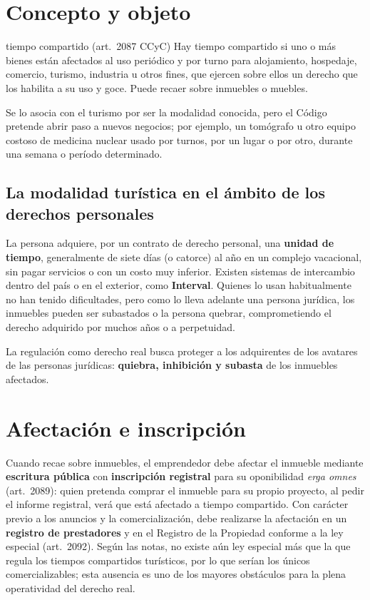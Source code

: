 \documentclass[12pt,oneside]{book}
\begin{document}
\section{Concepto y objeto}

\begin{definicion}{tiempo compartido (art.~2087 CCyC)}
Hay tiempo compartido si uno o más bienes están afectados al uso periódico y por turno para alojamiento, hospedaje, comercio, turismo, industria u otros fines, que ejercen sobre ellos un derecho que los habilita a su uso y goce. Puede recaer sobre inmuebles o muebles.
\end{definicion}

Se lo asocia con el turismo por ser la modalidad conocida, pero el Código pretende abrir paso a nuevos negocios; por ejemplo, un tomógrafo u otro equipo costoso de medicina nuclear usado por turnos, por un lugar o por otro, durante una semana o período determinado.

\subsection{La modalidad turística en el ámbito de los derechos personales}

La persona adquiere, por un contrato de derecho personal, una \textbf{unidad de tiempo}, generalmente de siete días (o catorce) al año en un complejo vacacional, sin pagar servicios o con un costo muy inferior. Existen sistemas de intercambio dentro del país o en el exterior, como \textbf{Interval}. Quienes lo usan habitualmente no han tenido dificultades, pero como lo lleva adelante una persona jurídica, los inmuebles pueden ser subastados o la persona quebrar, comprometiendo el derecho adquirido por muchos años o a perpetuidad.

\begin{importante}
La regulación como derecho real busca proteger a los adquirentes de los avatares de las personas jurídicas: \textbf{quiebra, inhibición y subasta} de los inmuebles afectados.
\end{importante}

\section{Afectación e inscripción}

Cuando recae sobre inmuebles, el emprendedor debe afectar el inmueble mediante \textbf{escritura pública} con \textbf{inscripción registral} para su oponibilidad \textit{erga omnes} (art.~2089): quien pretenda comprar el inmueble para su propio proyecto, al pedir el informe registral, verá que está afectado a tiempo compartido. Con carácter previo a los anuncios y la comercialización, debe realizarse la afectación en un \textbf{registro de prestadores} y en el Registro de la Propiedad conforme a la ley especial (art.~2092). Según las notas, no existe aún ley especial más que la que regula los tiempos compartidos turísticos, por lo que serían los únicos comercializables; esta ausencia es uno de los mayores obstáculos para la plena operatividad del derecho real.
\end{document}
